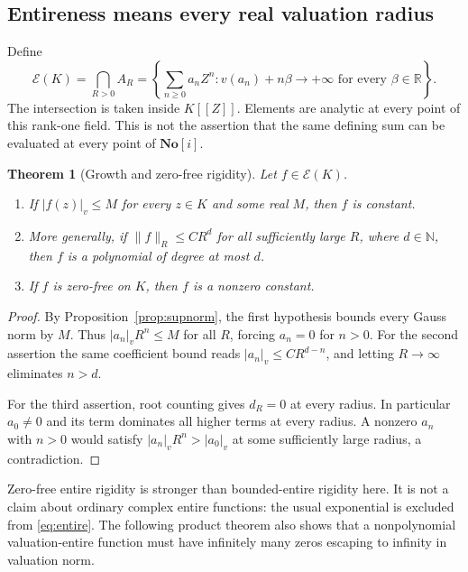 \documentclass[11pt,a4paper]{article}
\numberwithin{equation}{section}
\newtheorem{theorem}{Theorem}[section]
\theoremstyle{definition}
\theoremstyle{remark}
\newcommand{\No}{\mathbf{No}}
\newcommand{\R}{\mathbb R}
\newcommand{\N}{\mathbb N}
\newcommand{\EE}{\mathcal E}
\newcommand{\vabs}[1]{\lvert#1\rvert_v}
\newcommand{\Gauss}[2]{\lVert#1\rVert_{#2}}
\begin{document}
\subsection{Entireness means every real valuation radius}
Define
\begin{equation}\label{eq:entire}
 \EE(K)=\bigcap_{R>0}A_R
 =\left\{\sum_{n\ge0}a_nZ^n:
 v(a_n)+n\beta\to+\infty\text{ for every }\beta\in\R\right\}.
\end{equation}
The intersection is taken inside $K[[Z]]$. Elements are analytic at every
point of this rank-one field. This is not the assertion that the same defining
sum can be evaluated at every point of $\No[i]$.

\begin{theorem}[Growth and zero-free rigidity]\label{thm:liouville}
Let $f\in\EE(K)$.
\begin{enumerate}
\item If $\vabs{f(z)}\le M$ for every $z\in K$ and some real $M$, then $f$ is
constant.
\item More generally, if $\Gauss fR\le C R^d$ for all sufficiently large $R$,
where $d\in\N$, then $f$ is a polynomial of degree at most $d$.
\item If $f$ is zero-free on $K$, then $f$ is a nonzero constant.
\end{enumerate}
\end{theorem}
\begin{proof}
By Proposition~\ref{prop:supnorm}, the first hypothesis bounds every Gauss norm
by $M$. Thus $\vabs{a_n}R^n\le M$ for all $R$, forcing $a_n=0$ for $n>0$.
For the second assertion the same coefficient bound reads
$\vabs{a_n}\le C R^{d-n}$, and letting $R\to\infty$ eliminates $n>d$.

For the third assertion, root counting gives $d_R=0$ at every radius.
In particular $a_0\ne0$ and its term dominates all higher terms at every
radius. A nonzero $a_n$ with $n>0$ would satisfy
$\vabs{a_n}R^n>\vabs{a_0}$ at some sufficiently large radius, a contradiction.
\end{proof}

Zero-free entire rigidity is stronger than bounded-entire rigidity here. It is
not a claim about ordinary complex entire functions: the usual exponential is
excluded from \eqref{eq:entire}. The following product theorem also shows that
a nonpolynomial valuation-entire function must have infinitely many zeros
escaping to infinity in valuation norm.
\end{document}
